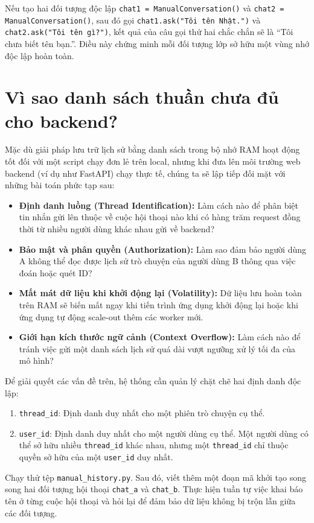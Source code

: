 \begin{aiexample}
Nếu tạo hai đối tượng độc lập \texttt{chat1 = ManualConversation()} và \texttt{chat2 = ManualConversation()}, sau đó gọi \texttt{chat1.ask("Tôi tên Nhật.")} và \texttt{chat2.ask("Tôi tên gì?")}, kết quả của câu gọi thứ hai chắc chắn sẽ là ``Tôi chưa biết tên bạn.''. Điều này chứng minh mỗi đối tượng lớp sở hữu một vùng nhớ độc lập hoàn toàn.
\end{aiexample}

\section{Vì sao danh sách thuần chưa đủ cho backend?}

Mặc dù giải pháp lưu trữ lịch sử bằng danh sách trong bộ nhớ RAM hoạt động tốt đối với một script chạy đơn lẻ trên local, nhưng khi đưa lên môi trường web backend (ví dụ như FastAPI) chạy thực tế, chúng ta sẽ lập tiếp đối mặt với những bài toán phức tạp sau:

\begin{itemize}
  \item \textbf{Định danh luồng (Thread Identification):} Làm cách nào để phân biệt tin nhắn gửi lên thuộc về cuộc hội thoại nào khi có hàng trăm request đồng thời từ nhiều người dùng khác nhau gửi về backend?
  \item \textbf{Bảo mật và phân quyền (Authorization):} Làm sao đảm bảo người dùng A không thể đọc được lịch sử trò chuyện của người dùng B thông qua việc đoán hoặc quét ID?
  \item \textbf{Mất mát dữ liệu khi khởi động lại (Volatility):} Dữ liệu lưu hoàn toàn trên RAM sẽ biến mất ngay khi tiến trình ứng dụng khởi động lại hoặc khi ứng dụng tự động scale-out thêm các worker mới.
  \item \textbf{Giới hạn kích thước ngữ cảnh (Context Overflow):} Làm cách nào để tránh việc gửi một danh sách lịch sử quá dài vượt ngưỡng xử lý tối đa của mô hình?
\end{itemize}

\begin{aidefinition}
Để giải quyết các vấn đề trên, hệ thống cần quản lý chặt chẽ hai định danh độc lập:
\begin{enumerate}
  \item \texttt{thread\_id}: Định danh duy nhất cho một phiên trò chuyện cụ thể.
  \item \texttt{user\_id}: Định danh duy nhất cho một người dùng cụ thể. Một người dùng có thể sở hữu nhiều \texttt{thread\_id} khác nhau, nhưng một \texttt{thread\_id} chỉ thuộc quyền sở hữu của một \texttt{user\_id} duy nhất.
\end{enumerate}
\end{aidefinition}

\begin{aicheckpoint}
Chạy thử tệp \texttt{manual\_history.py}. Sau đó, viết thêm một đoạn mã khởi tạo song song hai đối tượng hội thoại \texttt{chat\_a} và \texttt{chat\_b}. Thực hiện tuần tự việc khai báo tên ở từng cuộc hội thoại và hỏi lại để đảm bảo dữ liệu không bị trộn lẫn giữa các đối tượng.
\end{aicheckpoint}
